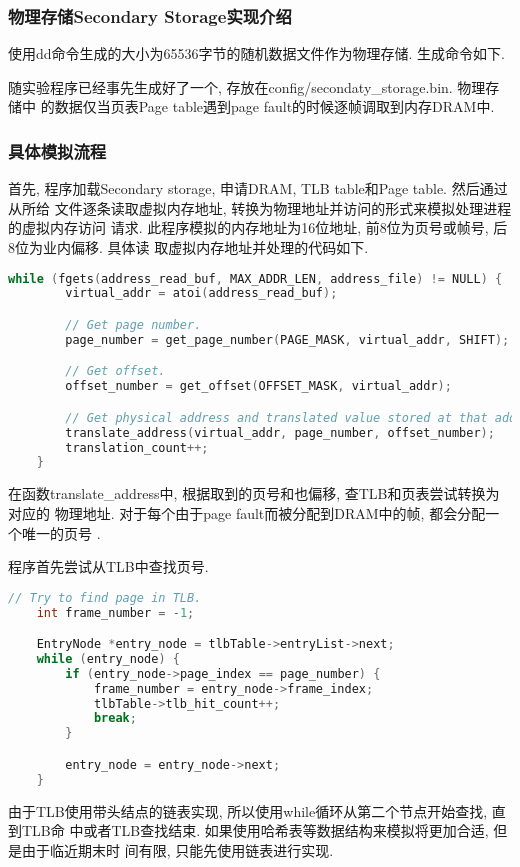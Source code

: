 \subsubsection{物理存储Secondary Storage实现介绍}
使用dd命令生成的大小为65536字节的随机数据文件作为物理存储. 生成命令如下.
随实验程序已经事先生成好了一个, 存放在config/secondaty\_storage.bin. 物理存储中
的数据仅当页表Page table遇到page fault的时候逐帧调取到内存DRAM中.

\subsubsection{具体模拟流程}
首先, 程序加载Secondary storage, 申请DRAM, TLB table和Page table. 然后通过从所给
文件逐条读取虚拟内存地址, 转换为物理地址并访问的形式来模拟处理进程的虚拟内存访问
请求. 此程序模拟的内存地址为16位地址, 前8位为页号或帧号, 后8位为业内偏移. 具体读
取虚拟内存地址并处理的代码如下.
\begin{lstlisting}[language=c++]
    while (fgets(address_read_buf, MAX_ADDR_LEN, address_file) != NULL) {
        virtual_addr = atoi(address_read_buf);

        // Get page number.
        page_number = get_page_number(PAGE_MASK, virtual_addr, SHIFT);

        // Get offset.
        offset_number = get_offset(OFFSET_MASK, virtual_addr);

        // Get physical address and translated value stored at that address.
        translate_address(virtual_addr, page_number, offset_number);
        translation_count++;
    }
\end{lstlisting}

在函数translate\_address中, 根据取到的页号和也偏移, 查TLB和页表尝试转换为对应的
物理地址. 对于每个由于page fault而被分配到DRAM中的帧, 都会分配一个唯一的页号
.\par

程序首先尝试从TLB中查找页号.
\begin{lstlisting}[language=c++]
    // Try to find page in TLB.
    int frame_number = -1;

    EntryNode *entry_node = tlbTable->entryList->next;
    while (entry_node) {
        if (entry_node->page_index == page_number) {
            frame_number = entry_node->frame_index;
            tlbTable->tlb_hit_count++;
            break;
        }

        entry_node = entry_node->next;
    }
\end{lstlisting}
由于TLB使用带头结点的链表实现, 所以使用while循环从第二个节点开始查找, 直到TLB命
中或者TLB查找结束. 如果使用哈希表等数据结构来模拟将更加合适, 但是由于临近期末时
间有限, 只能先使用链表进行实现.\par

